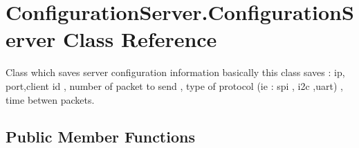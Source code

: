 \hypertarget{classConfigurationServer_1_1ConfigurationServer}{\section{Configuration\+Server.\+Configuration\+Server Class Reference}
\label{classConfigurationServer_1_1ConfigurationServer}
}


Class which saves server configuration information basically this class saves \+: ip, port,client id , number of packet to send , type of protocol (ie \+: spi , i2c ,uart) , time betwen packets.  


\subsection*{Public Member Functions}
